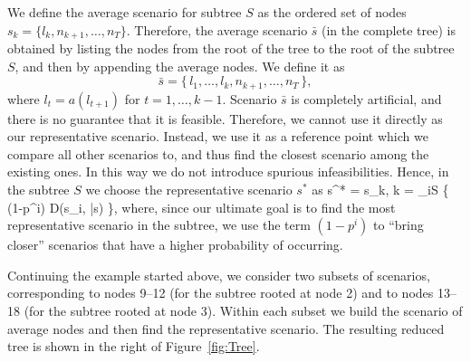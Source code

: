 We define the average scenario for subtree $S$ as the ordered
set of nodes $s_k = \{ l_k, n_{k+1}, \ldots, n_T \}$.
Therefore, the average scenario $\bar s$ (in the complete tree) 
is obtained by listing the 
nodes from the root of the tree to the root of the subtree $S$, and 
then by appending the average nodes. We define it as
\[
\bar s = \{\, l_1, \ldots, l_k, n_{k+1}, \ldots, n_T \,\},
\]
where $l_t = a(l_{t+1})$ for $t = 1,\ldots, k-1$.
Scenario $\bar{s}$ is completely artificial, and there is no guarantee 
that it is feasible. Therefore, we cannot use it directly as our 
representative scenario. Instead, we use it as a reference point
which we compare all other scenarios to, and thus find the closest scenario 
among the existing ones. In this way we do not introduce spurious 
infeasibilities. Hence, in the subtree $S$ we choose the 
representative scenario $s^*$ as 
%
\be  \label{repScenario}
   s^* = s_k, \quad k = \arg\min_{i\in S} \{ (1-p^i) D(s_i, \bar{s}) \},
\ee
%
where, since our ultimate goal is to find the most representative scenario in 
the subtree, we use the term $(1-p^i)$ to ``bring closer'' scenarios 
that have a higher probability of occurring.

Continuing the example started above, we consider two subsets of 
scenarios, corresponding to nodes 9--12 (for the subtree rooted at 
node 2) and to nodes 13--18 (for the subtree rooted at node 3). Within 
each subset we build the scenario of average nodes and then find the 
representative scenario.
The resulting reduced tree is shown in the right of Figure~\ref{fig:Tree}.

